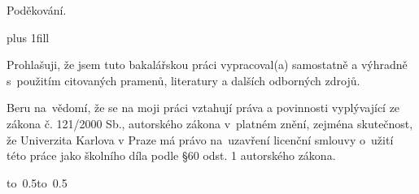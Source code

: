 \documentclass[12pt,a4paper]{report}
\let\openright=\clearpage
\begin{document}
\newpage



\openright

\noindent
Poděkování.

\newpage


\vglue 0pt plus 1fill

\noindent
Prohlašuji, že jsem tuto bakalářskou práci vypracoval(a) samostatně a výhradně
s~použitím citovaných pramenů, literatury a dalších odborných zdrojů.

\medskip\noindent
Beru na~vědomí, že se na moji práci vztahují práva a povinnosti vyplývající
ze zákona č. 121/2000 Sb., autorského zákona v~platném znění, zejména skutečnost,
že Univerzita Karlova v Praze má právo na~uzavření licenční smlouvy o~užití této
práce jako školního díla podle §60 odst. 1 autorského zákona.

\vspace{10mm}

\hbox{\hbox to 0.5\hbox to 0.5}

\vspace{20mm}
\newpage

\end{document}

